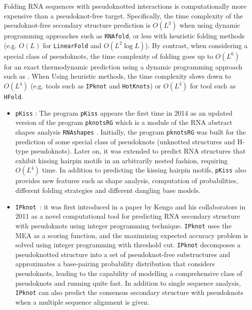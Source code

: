 Folding \ac{RNA} sequences with pseudoknotted interactions is computationally more expensive than a pseudoknot-free target. Specifically, the time complexity of the pseudoknot-free secondary structure prediction is $O(L^3)$ when using dynamic programming approaches such as \texttt{RNAfold},  or less with heuristic folding methods (e.g. $O(L)$ for \texttt{LinearFold} and $O(L^2\log L)$). By contrast, when considering a special class of pseudoknots, the time complexity of folding goes up to $O(L^6)$ for an exact thermodynamic prediction using a dynamic programming approach such as \cite{pseudoknotDP}. When Using heuristic methods, the time complexity slows down to $O(L^4)$ (e.g. tools such as \texttt{IPknot} and \texttt{HotKnots}) or $O(L^3)$ for tool such as \texttt{HFold}.  
\begin{itemize}
	\item \texttt{pKiss} \cite{jangie2015}: The program \texttt{pKiss} appears the first time in 2014 as an updated version of the program \texttt{pknotsRG}\cite{reeder2007pknotsrg} which is a module of the \ac{RNA} abstract shapes analysis  \texttt{RNAshapes} \cite{jangie2015}. Initially, the program \texttt{pknotsRG} was built for the prediction of some special class of pseudoknots (unknotted structures and H-type pseudoknots). Later on, it was extended to predict \ac{RNA} structures that exhibit kissing hairpin motifs in an arbitrarily nested fashion, requiring $O(L^4)$ time. In addition to predicting the kissing hairpin motifs, \texttt{pKiss} also provides new features such as shape analysis, computation of probabilities, different folding strategies and different dangling base models. 
	
	\item \texttt{IPknot \cite{sato2011ipknot}}: it was first introduced in a paper by Kengo and his collaborators in 2011 as a novel computational tool for predicting \ac{RNA} secondary structure with pseudoknots using integer programming technique. \texttt{IPknot} uses the \ac{MEA} as a scoring function, and the maximizing expected accuracy problem is solved using integer programming with threshold cut. \texttt{IPknot} decomposes a pseudoknotted structure into a set of pseudoknot-free substructures and approximates a base-pairing probability distribution that considers pseudoknots, leading to the capability of modelling a comprehensive class of pseudoknots and running quite fast. In addition to single sequence analysis, \texttt{IPknot} can also predict the consensus secondary structure with pseudoknots when a multiple sequence alignment is given.
	

\end{itemize}
